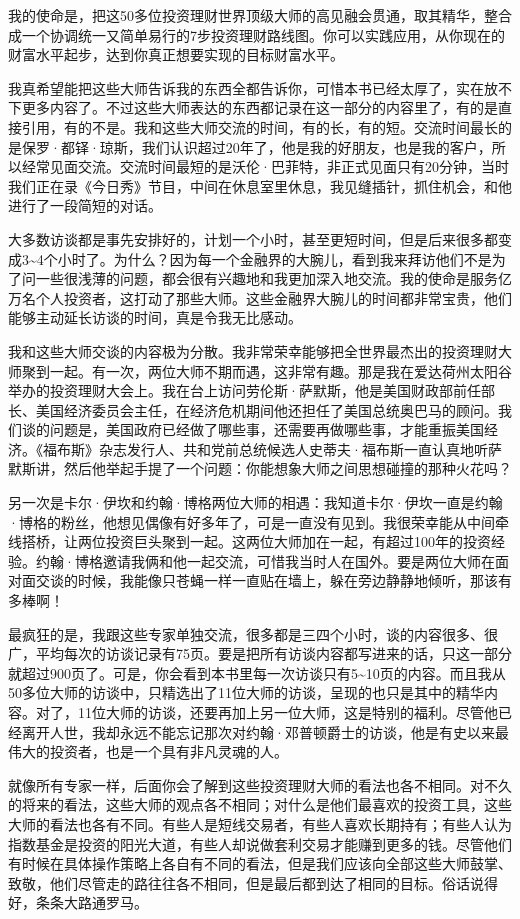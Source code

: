 我的使命是，把这50多位投资理财世界顶级大师的高见融会贯通，取其精华，整合成一个协调统一又简单易行的7步投资理财路线图。你可以实践应用，从你现在的财富水平起步，达到你真正想要实现的目标财富水平。

我真希望能把这些大师告诉我的东西全都告诉你，可惜本书已经太厚了，实在放不下更多内容了。不过这些大师表达的东西都记录在这一部分的内容里了，有的是直接引用，有的不是。我和这些大师交流的时间，有的长，有的短。交流时间最长的是保罗·都铎·琼斯，我们认识超过20年了，他是我的好朋友，也是我的客户，所以经常见面交流。交流时间最短的是沃伦·巴菲特，非正式见面只有20分钟，当时我们正在录《今日秀》节目，中间在休息室里休息，我见缝插针，抓住机会，和他进行了一段简短的对话。

大多数访谈都是事先安排好的，计划一个小时，甚至更短时间，但是后来很多都变成3\textasciitilde{}4个小时了。为什么？因为每一个金融界的大腕儿，看到我来拜访他们不是为了问一些很浅薄的问题，都会很有兴趣地和我更加深入地交流。我的使命是服务亿万名个人投资者，这打动了那些大师。这些金融界大腕儿的时间都非常宝贵，他们能够主动延长访谈的时间，真是令我无比感动。

我和这些大师交谈的内容极为分散。我非常荣幸能够把全世界最杰出的投资理财大师聚到一起。有一次，两位大师不期而遇，这非常有趣。那是我在爱达荷州太阳谷举办的投资理财大会上。我在台上访问劳伦斯·萨默斯，他是美国财政部前任部长、美国经济委员会主任，在经济危机期间他还担任了美国总统奥巴马的顾问。我们谈的问题是，美国政府已经做了哪些事，还需要再做哪些事，才能重振美国经济。《福布斯》杂志发行人、共和党前总统候选人史蒂夫·福布斯一直认真地听萨默斯讲，然后他举起手提了一个问题：你能想象大师之间思想碰撞的那种火花吗？

另一次是卡尔·伊坎和约翰·博格两位大师的相遇：我知道卡尔·伊坎一直是约翰·博格的粉丝，他想见偶像有好多年了，可是一直没有见到。我很荣幸能从中间牵线搭桥，让两位投资巨头聚到一起。这两位大师加在一起，有超过100年的投资经验。约翰·博格邀请我俩和他一起交流，可惜我当时人在国外。要是两位大师在面对面交谈的时候，我能像只苍蝇一样一直贴在墙上，躲在旁边静静地倾听，那该有多棒啊！

最疯狂的是，我跟这些专家单独交流，很多都是三四个小时，谈的内容很多、很广，平均每次的访谈记录有75页。要是把所有访谈内容都写进来的话，只这一部分就超过900页了。可是，你会看到本书里每一次访谈只有5\textasciitilde{}10页的内容。而且我从50多位大师的访谈中，只精选出了11位大师的访谈，呈现的也只是其中的精华内容。对了，11位大师的访谈，还要再加上另一位大师，这是特别的福利。尽管他已经离开人世，我却永远不能忘记那次对约翰·邓普顿爵士的访谈，他是有史以来最伟大的投资者，也是一个具有非凡灵魂的人。

就像所有专家一样，后面你会了解到这些投资理财大师的看法也各不相同。对不久的将来的看法，这些大师的观点各不相同；对什么是他们最喜欢的投资工具，这些大师的看法也各有不同。有些人是短线交易者，有些人喜欢长期持有；有些人认为指数基金是投资的阳光大道，有些人却说做套利交易才能赚到更多的钱。尽管他们有时候在具体操作策略上各自有不同的看法，但是我们应该向全部这些大师鼓掌、致敬，他们尽管走的路往往各不相同，但是最后都到达了相同的目标。俗话说得好，条条大路通罗马。

